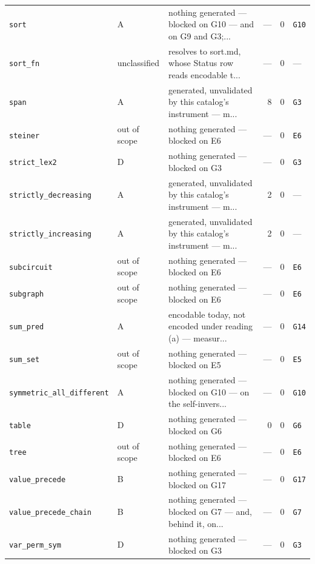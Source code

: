 \documentclass[10pt,a4paper]{article}
\begin{document}
\begin{longtable}{@{}>{\raggedright\arraybackslash}p{}l>{\raggedright\arraybackslash}p{}rrl@{}}
\texttt{sort} & A & nothing generated --- blocked on G10 --- and on G9 and G3;... & --- & 0 & \texttt{G10} \\
\texttt{sort\_\allowbreak{}fn} & unclassified & resolves to sort.md, whose Status row reads encodable t... & --- & 0 & --- \\
\texttt{span} & A & generated, unvalidated by this catalog's instrument --- m... & 8 & 0 & \texttt{G3} \\
\texttt{steiner} & out of scope & nothing generated --- blocked on E6 & --- & 0 & \texttt{E6} \\
\texttt{strict\_\allowbreak{}lex2} & D & nothing generated --- blocked on G3 & --- & 0 & \texttt{G3} \\
\texttt{strictly\_\allowbreak{}decreasing} & A & generated, unvalidated by this catalog's instrument --- m... & 2 & 0 & --- \\
\texttt{strictly\_\allowbreak{}increasing} & A & generated, unvalidated by this catalog's instrument --- m... & 2 & 0 & --- \\
\texttt{subcircuit} & out of scope & nothing generated --- blocked on E6 & --- & 0 & \texttt{E6} \\
\texttt{subgraph} & out of scope & nothing generated --- blocked on E6 & --- & 0 & \texttt{E6} \\
\texttt{sum\_\allowbreak{}pred} & A & encodable today, not encoded under reading (a) --- measur... & --- & 0 & \texttt{G14} \\
\texttt{sum\_\allowbreak{}set} & out of scope & nothing generated --- blocked on E5 & --- & 0 & \texttt{E5} \\
\texttt{symmetric\_\allowbreak{}all\_\allowbreak{}different} & A & nothing generated --- blocked on G10 --- on the self-invers... & --- & 0 & \texttt{G10} \\
\texttt{table} & D & nothing generated --- blocked on G6 & 0 & 0 & \texttt{G6} \\
\texttt{tree} & out of scope & nothing generated --- blocked on E6 & --- & 0 & \texttt{E6} \\
\texttt{value\_\allowbreak{}precede} & B & nothing generated --- blocked on G17 & --- & 0 & \texttt{G17} \\
\texttt{value\_\allowbreak{}precede\_\allowbreak{}chain} & B & nothing generated --- blocked on G7 --- and, behind it, on... & --- & 0 & \texttt{G7} \\
\texttt{var\_\allowbreak{}perm\_\allowbreak{}sym} & D & nothing generated --- blocked on G3 & --- & 0 & \texttt{G3} \\

\end{longtable}
\end{document}
